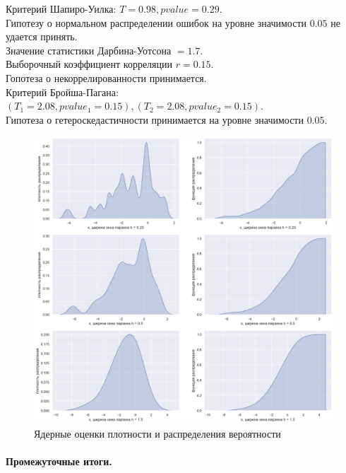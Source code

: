 \documentclass[a4paper,12pt]{article}
\begin{document}
Критерий Шапиро-Уилка: $T = 0.98, pvalue = 0.29$.\\
Гипотезу о нормальном распределении ошибок на уровне значимости $0.05$ не удается принять.\\

Значение статистики Дарбина-Уотсона $ = 1.7$.\\
Выборочный коэффициент корреляции $r = 0.15$.\\
Гопотеза о некоррелированности принимается.\\

Критерий Бройша-Пагана: $(T_1 = 2.08, pvalue_1 = 0.15), (T_2 = 2.08, pvalue_2 = 0.15)$.\\
Гипотеза о гетероскедастичности принимается на уровне значимости $0.05$.\\

\begin{figure}[H]
    \includegraphics[width=\linewidth]{src/img/ядерные_оценки.png}
    \caption{Ядерные оценки плотности и распределения вероятности}
\end{figure}


\paragraph{Промежуточные итоги.\\}
\end{document}
